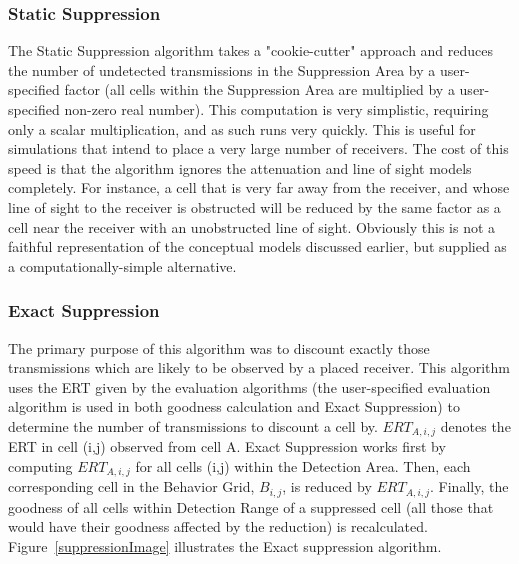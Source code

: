 \subsubsection{Static Suppression}
\label{staticSuppression}
The Static Suppression algorithm takes a "cookie-cutter" approach and reduces the number of undetected transmissions in the Suppression Area by a user-specified factor (all cells within the Suppression Area are multiplied by a user-specified non-zero real number).  This computation is very simplistic, requiring only a scalar multiplication, and as such runs very quickly.  This is useful for simulations that intend to place a very large number of receivers.  The cost of this speed is that the algorithm ignores the attenuation and line of sight models completely.  For instance, a cell that is very far away from the receiver, and whose line of sight to the receiver is obstructed will be reduced by the same factor as a cell near the receiver with an unobstructed line of sight.  Obviously this is not a faithful representation of the conceptual models discussed earlier, but supplied as a computationally-simple alternative.

\subsubsection{Exact Suppression}
\label{exactSuppression}
The primary purpose of this algorithm was to discount exactly those transmissions which are likely to be observed by a placed receiver.  This algorithm uses the ERT given by the evaluation algorithms (the user-specified evaluation algorithm is used in both goodness calculation and Exact Suppression) to determine the number of transmissions to discount a cell by.  $ERT_{A,i,j}$ denotes the ERT in cell (i,j) observed from cell A.  Exact Suppression works first by computing $ERT_{A,i,j}$ for all cells (i,j)  within the Detection Area.  Then, each corresponding cell in the Behavior Grid, $B_{i,j}$, is reduced by $ERT_{A,i,j}$.  Finally, the goodness of all cells within Detection Range of a suppressed cell (all those that would have their goodness affected by the reduction) is recalculated.  Figure~\ref{suppressionImage} illustrates the Exact suppression algorithm.  

